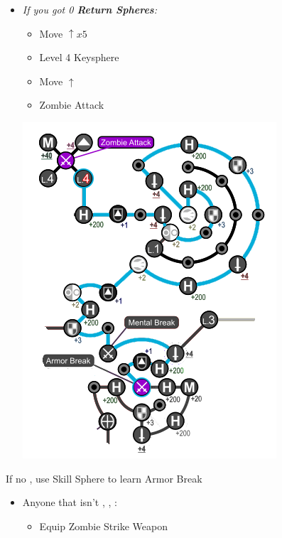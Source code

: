 \begin{spheregrid}
\begin{multicols}{2}
\begin{itemize}
\begin{itemize}
				      \item \textit{If you got 0 \textbf{Return Spheres}:}
				            \begin{itemize}
					            \item Move $\uparrow x5$
					            \item Level 4 Keysphere
					            \item Move $\uparrow$
					            \item Zombie Attack
				            \end{itemize}
						\includegraphics[width=.8\columnwidth]{graphics/Tidus_BFA}
			      \end{itemize}
				            \rikkuf If no \od, use Skill Sphere to learn Armor Break
		\end{itemize}
	\end{multicols}
\end{spheregrid}
\colstart
	\begin{equip}
		\begin{itemize}
			\item Anyone that isn't \tidus, \yuna, \auron:
			      \begin{itemize}
				      \item Equip Zombie Strike Weapon
			      \end{itemize}
		\end{itemize}
	\end{equip}

